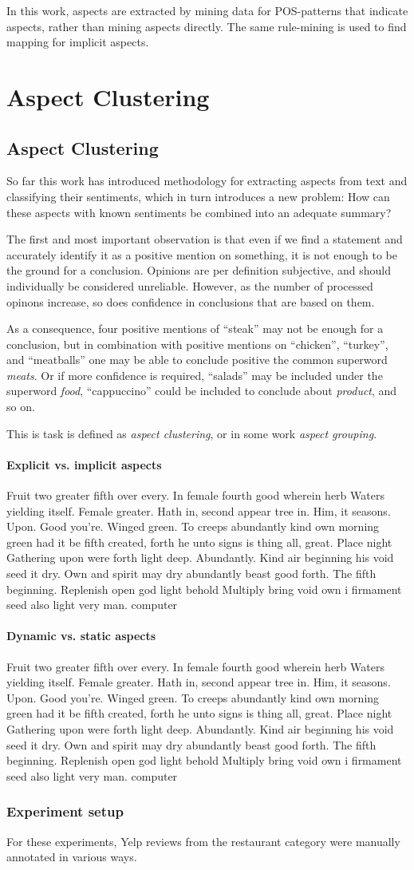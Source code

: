 \documentclass[a4paper,11pt]{kth-mag}
\newcommand{\category}{restaurant category }  %
\newcommand{\loremipsum}{
  {\color{lightgray}
  Fruit two greater fifth over every. In female fourth good wherein herb
  Waters yielding itself. Female greater. Hath in, second appear tree in.
  Him, it seasons. Upon. Good you're. Winged green. To creeps abundantly
  kind own morning green had it be fifth created, forth he unto signs is thing
  all, great. Place night Gathering upon were forth light deep. Abundantly.
  Kind air beginning his void seed it dry. Own and spirit may dry abundantly
  beast good forth. The fifth beginning. Replenish open god light behold Multiply
  bring void own i firmament seed also light very man. \gls{computer}

  }
}
\begin{document}
In this work, aspects are extracted by mining data for POS-patterns that indicate aspects, rather than mining aspects directly. The same rule-mining is used to find mapping for implicit aspects.





\part{Aspect Clustering}
\chapter{Aspect Clustering}
So far this work has introduced methodology for extracting aspects from text and classifying their sentiments, which in turn introduces a new problem: How can these aspects with known sentiments be combined into an adequate summary?

The first and most important observation is that even if we find a statement and accurately identify it as a positive mention on something, it is not enough to be the ground for a conclusion. Opinions are per definition subjective, and should individually be considered unreliable. However, as the number of processed opinons increase, so does confidence in conclusions that are based on them.

As a consequence, four positive mentions of ``steak'' may not be enough for a conclusion, but in combination with positive mentions on ``chicken'', ``turkey'',  and ``meatballs'' one may be able to conclude positive the common \gls{superword} \emph{meats}. Or if more confidence is required, ``salads'' may be included under the \gls{superword} \emph{food}, ``cappuccino'' could be included to conclude about \emph{product}, and so on.

This is task is defined as \emph{aspect clustering}, or in some work \emph{aspect grouping}.

\subsection{Explicit vs. implicit aspects}
\loremipsum

\subsection{Dynamic vs. static aspects}
\loremipsum



\section{Experiment setup}
For these experiments, Yelp reviews from the \category were manually annotated in various ways.
\end{document}
